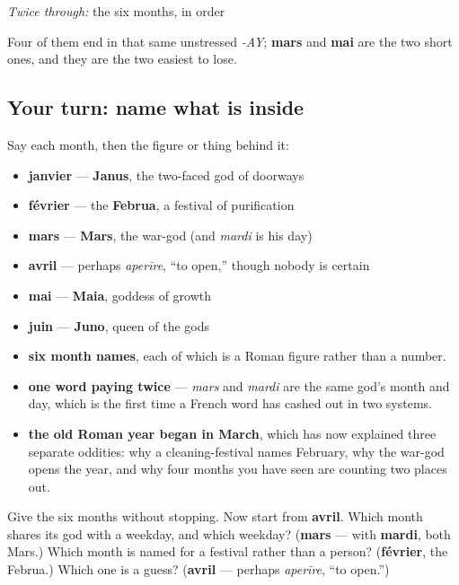 \emph{Twice through:} the six months, in order

Four of them end in that same unstressed \emph{-AY}; \textbf{mars} and \textbf{mai} are the two short ones, and they are the two easiest to lose.

\subsection*{Your turn: name what is inside}
Say each month, then the figure or thing behind it:

\begin{itemize}
\raggedright
  \item \textbf{janvier} — \textbf{Janus}, the two-faced god of doorways
  \item \textbf{février} — the \textbf{Februa}, a festival of purification
  \item \textbf{mars} — \textbf{Mars}, the war-god (and \emph{mardi} is his day)
  \item \textbf{avril} — perhaps \emph{aperīre}, \textquotedblleft{}to open,\textquotedblright{} though nobody is certain
  \item \textbf{mai} — \textbf{Maia}, goddess of growth
  \item \textbf{juin} — \textbf{Juno}, queen of the gods
\end{itemize}

\begin{grammarlens}[title={What you've built this chapter}]
\begin{itemize}
\raggedright
  \item \textbf{six month names}, each of which is a Roman figure rather than a number.
  \item \textbf{one word paying twice} — \emph{mars} and \emph{mardi} are the same god's month and day, which is the first time a French word has cashed out in two systems.
  \item \textbf{the old Roman year began in March}, which has now explained three separate oddities: why a cleaning-festival names February, why the war-god opens the year, and why four months you have seen are counting two places out.
\end{itemize}
\end{grammarlens}

\begin{tcolorbox}[breakable,colback=teal!4,colframe=teal!35!black,title={Before you move on}]
Give the six months without stopping. Now start from \textbf{avril}. Which month shares its god with a weekday, and which weekday? (\textbf{mars} — with \textbf{mardi}, both Mars.) Which month is named for a festival rather than a person? (\textbf{février}, the Februa.) Which one is a guess? (\textbf{avril} — perhaps \emph{aperīre}, \textquotedblleft{}to open.\textquotedblright{})
\end{tcolorbox}
